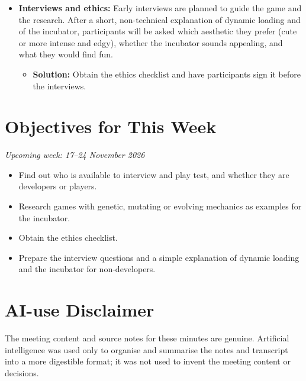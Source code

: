 \documentclass[12pt,a4paper]{article}
\begin{document}
\begin{itemize}[leftmargin=*]
\begin{itemize}
        evolving mechanics, such as Skylanders, the Game of Life, and games
        where species or worlds mutate and evolve, and use them as examples to
        build on.
    \end{itemize}
    \item \textbf{Interviews and ethics:} Early interviews are planned to
    guide the game and the research. After a short, non-technical explanation
    of dynamic loading and of the incubator, participants will be asked which
    aesthetic they prefer (cute or more intense and edgy), whether the
    incubator sounds appealing, and what they would find fun.
    \begin{itemize}
        \item \textbf{Solution:} Obtain the ethics checklist and have
        participants sign it before the interviews.
    \end{itemize}
\end{itemize}

\section{Objectives for This Week}

\noindent\textit{Upcoming week: 17--24 November 2026}

\begin{itemize}[leftmargin=*]
    \item Find out who is available to interview and play test, and whether
    they are developers or players.
    \item Research games with genetic, mutating or evolving mechanics as
    examples for the incubator.
    \item Obtain the ethics checklist.
    \item Prepare the interview questions and a simple explanation of dynamic
    loading and the incubator for non-developers.
\end{itemize}

\section*{\small AI-use Disclaimer}
\small The meeting content and source notes for these minutes are genuine.
Artificial intelligence was used only to organise and summarise the notes
and transcript into a more digestible format; it was not used to invent the
meeting content or decisions.
\end{document}
